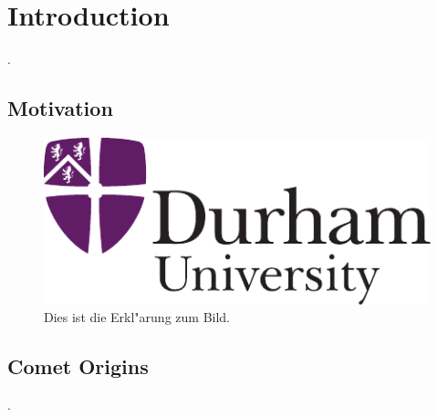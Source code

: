 \chapter{Introduction}

\lipsum[100]
\cite{2014MNRAS.437L..71S}.


\section{Motivation}

\lipsum[100]



\begin{figure}[htb]
  \centering
  \includegraphics[scale=0.5]{DU_2-col_sml.pdf}
  \caption[Kurzform f"ur das Abbildungsverzeichnis]{Dies ist die Erkl"arung zum Bild.}
\end{figure}


\section{Comet Origins}

\lipsum[100] \cite{FERNANDEZ198746}.

\lipsum

